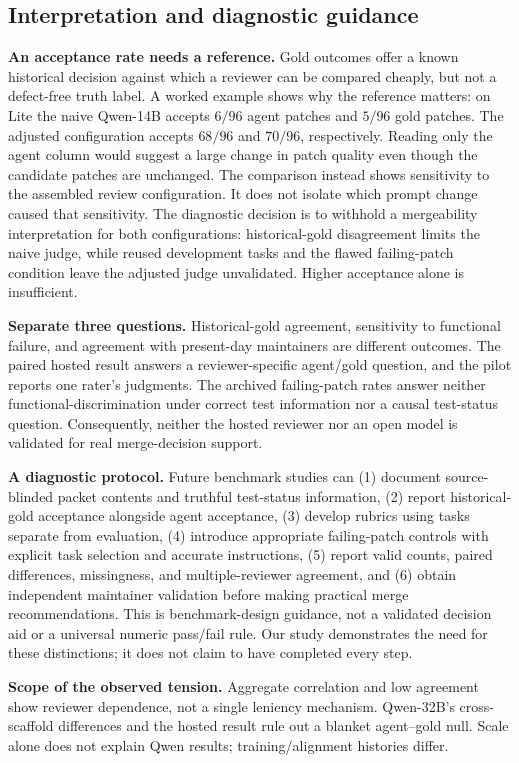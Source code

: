 \documentclass[10pt,conference]{IEEEtran}
\begin{document}
\subsection{Interpretation and diagnostic guidance}
\textbf{An acceptance rate needs a reference.} Gold outcomes offer a known historical
decision against which a reviewer can be compared cheaply, but not a defect-free truth
label. A worked example shows why the reference matters: on Lite the naive Qwen-14B
accepts $6/96$ agent patches and $5/96$ gold patches. The adjusted configuration accepts
$68/96$ and $70/96$, respectively. Reading only the agent column would suggest a large
change in patch quality even though the candidate patches are unchanged. The comparison
instead shows sensitivity to the assembled review configuration. It does not isolate
which prompt change caused that sensitivity. The diagnostic decision is to withhold
a mergeability interpretation for both configurations: historical-gold disagreement
limits the naive judge, while reused development tasks and the flawed failing-patch
condition leave the adjusted judge unvalidated. Higher acceptance alone is insufficient.

\textbf{Separate three questions.} Historical-gold agreement, sensitivity to functional
failure, and agreement with present-day maintainers are different outcomes. The paired
hosted result answers a reviewer-specific agent/gold question, and the pilot reports one
rater's judgments. The archived failing-patch rates answer neither functional-discrimination
under correct test information nor a causal test-status question. Consequently, neither
the hosted reviewer nor an open model is validated for real merge-decision support.

\textbf{A diagnostic protocol.} Future benchmark studies can (1) document source-blinded
packet contents and truthful test-status information, (2) report historical-gold acceptance
alongside agent acceptance, (3) develop rubrics using tasks separate from evaluation,
(4) introduce appropriate failing-patch controls with explicit task selection and accurate
instructions, (5) report valid counts, paired differences, missingness, and multiple-reviewer
agreement, and (6) obtain independent maintainer validation before making practical merge
recommendations. This is benchmark-design guidance, not a validated decision aid or a
universal numeric pass/fail rule. Our study demonstrates the need for these distinctions;
it does not claim to have completed every step.

\textbf{Scope of the observed tension.} Aggregate correlation and low agreement
show reviewer dependence, not a single leniency mechanism. Qwen-32B's
cross-scaffold differences and the hosted result rule out a blanket agent--gold
null. Scale alone does not explain Qwen results; training/alignment histories differ.
\end{document}
